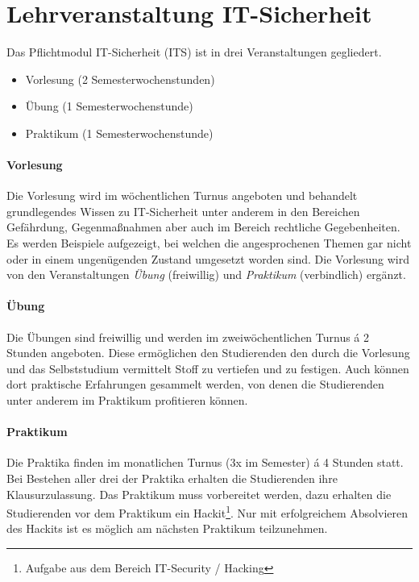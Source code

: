\section{Lehrveranstaltung IT-Sicherheit} \label{sec:Lehrveranstaltung_IT-Sicherheit}

Das Pflichtmodul IT-Sicherheit (ITS) ist in drei Veranstaltungen gegliedert.\cite[S.30]{hochschuleniederrheinModulhandbuchVollzeitBA2019}
\begin{itemize}
	\item Vorlesung (2 Semesterwochenstunden)
	\item Übung (1 Semesterwochenstunde)
	\item Praktikum (1 Semesterwochenstunde)
\end{itemize}

\paragraph{Vorlesung}\label{para:Vorlesung}
Die Vorlesung wird im wöchentlichen Turnus angeboten und behandelt grundlegendes Wissen zu IT-Sicherheit unter anderem in den Bereichen Gefährdung, Gegenmaßnahmen aber auch im Bereich rechtliche Gegebenheiten. Es werden Beispiele aufgezeigt, bei welchen die angesprochenen Themen gar nicht oder in einem ungenügenden Zustand umgesetzt worden sind. Die Vorlesung wird von den Veranstaltungen \textit{Übung} (freiwillig) und \textit{Praktikum} (verbindlich) ergänzt.

\paragraph{Übung}\label{para:Übung}
Die Übungen sind freiwillig und werden im zweiwöchentlichen Turnus á 2 Stunden angeboten. Diese ermöglichen den Studierenden den durch die Vorlesung und das Selbststudium vermittelt Stoff zu vertiefen und zu festigen. Auch können dort praktische Erfahrungen gesammelt werden, von denen die Studierenden unter anderem im Praktikum profitieren können.

\paragraph{Praktikum}\label{para:Praktikum}
Die Praktika finden im monatlichen Turnus (3x im Semester) á 4 Stunden statt. Bei Bestehen aller drei der Praktika erhalten die Studierenden ihre Klausurzulassung. Das Praktikum muss vorbereitet werden, dazu erhalten die Studierenden vor dem Praktikum ein Hackit\footnote{Aufgabe aus dem Bereich IT-Security / Hacking}. Nur mit erfolgreichem Absolvieren des Hackits ist es möglich am nächsten Praktikum teilzunehmen.\cite{quadePraktikumITSecurity2017}